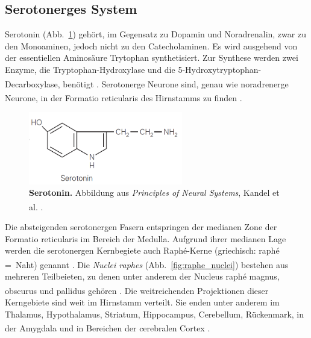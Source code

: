 \documentclass[12pt,a4paper,pdftex]{article}
\begin{document}
\subsection{Serotonerges System}
\label{serotonerges_system}
Serotonin (Abb.~\ref{fig:serotonin}) gehört, im Gegensatz zu Dopamin und Noradrenalin, zwar zu den Monoaminen, jedoch nicht zu den Catecholaminen. Es wird ausgehend von der essentiellen Aminosäure Trytophan synthetisiert. Zur Synthese werden zwei Enzyme, die Tryptophan-Hydroxylase und die 5-Hydroxytryptophan-Decarboxylase, benötigt \textsuperscript{\cite[13]{kandel2013principles}}. Serotonerge Neurone sind, genau wie noradrenerge Neurone, in der Formatio reticularis des Hirnstamms zu finden \textsuperscript{\cite[7]{trepel2011neuroanatomie}}.

\begin{figure}[H]
    \centering
    \includegraphics[width=0.6\textwidth]{pictures/Bilder_monoamine_systeme/serotonin.PNG}
    \caption[Serotonin]{\textbf{Serotonin.} Abbildung aus \textit{Principles of Neural Systems}, Kandel et al. \textsuperscript{\cite[13]{kandel2013principles}}.}
    \label{fig:serotonin}
\end{figure}{}

Die absteigenden serotonergen Fasern entspringen der medianen Zone der Formatio reticularis im Bereich der Medulla. Aufgrund ihrer medianen Lage werden die serotonergen Kernbegiete auch Raphé-Kerne (griechisch: raphé =~Naht) genannt \textsuperscript{\cite[6]{trepel2011neuroanatomie}}. Die \textit{Nuclei raphes} (Abb.~\ref{fig:raphe_nuclei}) bestehen aus mehreren Teilbeieten, zu denen unter anderem der Nucleus raphé magnus, obscurus und pallidus gehören \textsuperscript{\cite[15]{paxinos2014rat}}. Die weitreichenden Projektionen dieser Kerngebiete sind weit im Hirnstamm verteilt. Sie enden unter anderem im Thalamus, Hypothalamus, Striatum, Hippocampus, Cerebellum, Rückenmark, in der Amygdala und in Bereichen der cerebralen Cortex \textsuperscript{\cite[9]{crossman2014neuroanatomy}}. 
\end{document}
